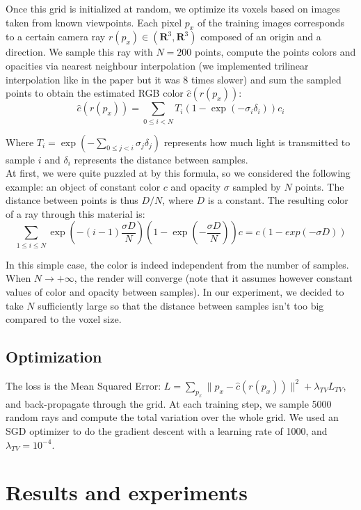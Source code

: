 \documentclass{article}
\begin{document}
Once this grid is initialized at random, we optimize its voxels based on images taken from known viewpoints. Each pixel $p_x$ of the training images corresponds to a certain camera ray $r(p_x) \in (\mathbf{R}^3, \mathbf{R}^3)$ composed of an origin and a direction. We sample this ray with $N=200$ points, compute the points colors and opacities via nearest neighbour interpolation (we implemented trilinear interpolation like in the paper but it was 8 times slower) and sum the sampled points to obtain the estimated RGB color $\hat{c}(r(p_x))$:
\[\hat{c}(r(p_x)) = \sum_{0\leq i<N} T_i (1 - \exp(-\sigma_i \delta_i)) c_i\] 

Where $ T_i = \exp(- \sum_{0\leq j<i} \sigma_j \delta_j)$ represents how much light is transmitted to sample $i$ and $\delta_i$ represents the distance between samples.\\ 

At first, we were quite puzzled at by this formula, so we considered the following example: an object of constant color $c$ and opacity $\sigma$ sampled by $N$ points. The distance between points is thus $D/N$, where $D$ is a constant. The resulting color of a ray through this material is:
\[ \sum_{1 \leq i \leq N} \exp(- (i-1)\frac{ \sigma D}{N})(1 - \exp(-  \frac{ \sigma D}{N}))c = c (1 - exp(- \sigma D))\]

In this simple case, the color is indeed independent from the number of samples. When $N \rightarrow + \infty$, the render will converge (note that it assumes however constant values of color and opacity between samples). In our experiment, we decided to take $N$ sufficiently large so that the distance between samples isn't too big compared to the voxel size.


\subsection{Optimization}
The loss is the Mean Squared Error: $L = \sum_{p_x} \|p_x -\hat{c}(r(p_x)) \|^2 + \lambda_{TV}  L_{TV}$, and back-propagate through the grid. At each training step, we sample 5000 random rays and compute the total variation over the whole grid. We used an SGD optimizer to do the gradient descent with a learning rate of 1000, and $\lambda_{TV} = 10^{-4}$. 

\section{Results and experiments}\label{sec:results}
\end{document}
